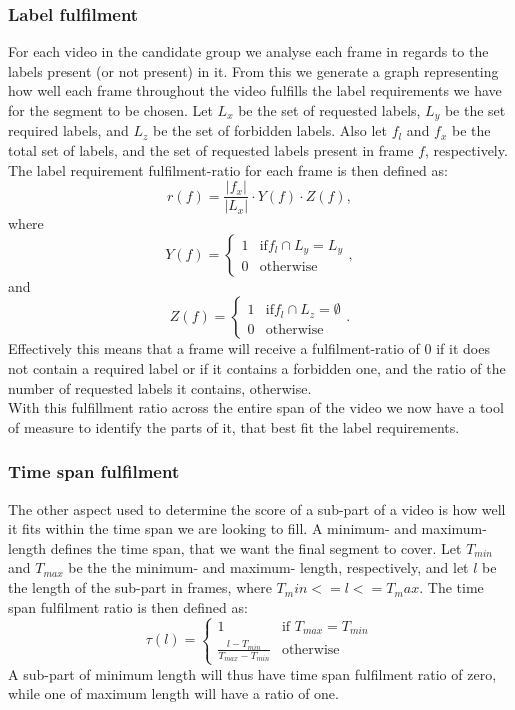 \subsubsection{Label fulfilment}
%
For each video in the candidate group we analyse each frame in regards to the labels present (or not present) in it. From this we generate a graph representing how well each frame throughout the video fulfills the label requirements we have for the segment to be chosen. Let $L_{x}$ be the set of requested labels, $L_{y}$ be the set required labels, and $L_{z}$ be the set of forbidden labels. Also let $f_{l}$ and $f_{x}$ be the total set of labels, and the set of requested labels present in frame $f$, respectively. The label requirement fulfilment-ratio for each frame is then defined as:\\
%
\begin{equation}
r(f) = \frac{|f_{x}|}{|L_{x}|} \cdot Y(f) \cdot Z(f),
\end{equation} 
%
where
%
\begin{equation}
Y(f) =
\begin{cases}
1 & \text{if} f_{l} \cap L_{y} = L_{y}\\
0 &  \text{otherwise}
\end{cases},
\end{equation} 
%
and
%
\begin{equation}
Z(f) =
\begin{cases}
1 & \text{if} f_{l} \cap L_{z} = \emptyset\\
0 &  \text{otherwise}
\end{cases}.
\end{equation} 
%
Effectively this means that a frame will receive a fulfilment-ratio of 0 if it does not contain a required label or if it contains a forbidden one, and the ratio of the number of requested labels it contains, otherwise.\\
%
With this fulfillment ratio across the entire span of the video we now have a tool of measure to identify the parts of it, that best fit the label requirements.
%
\subsubsection{Time span fulfilment}
%
The other aspect used to determine the score of a sub-part of a video is how well it fits within the time span we are looking to fill. A minimum- and maximum- length defines the time span, that we want the final segment to cover. Let $T_{min}$ and $T_{max}$ be the the minimum- and maximum- length, respectively, and let $l$ be the length of the sub-part in frames, where $T_min <= l <= T_max$. The time span fulfilment ratio is then defined as:\\
%
\begin{equation}
\tau(l) =
\begin{cases}
1 & \text{if } T_{max} = T_{min}\\
\frac{l-T_{min}}{T_{max}-T_{min}} &  \text{otherwise}
\end{cases}
\end{equation}\label{equ:fulfilment}
%
A sub-part of minimum length will thus have time span fulfilment ratio of zero, while one of maximum length will have a ratio of one. 
%
